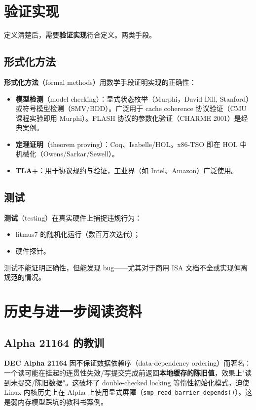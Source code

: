 \section{验证实现}

定义清楚后，需要\textbf{验证实现}符合定义。两类手段。

\subsection{形式化方法}

\textbf{形式化方法}（formal methods）用数学手段证明实现的正确性：

\begin{itemize}
\item \textbf{模型检测}（model checking）：显式状态枚举（Murphi，David Dill, Stanford）或符号模型检测（SMV/BDD）。广泛用于 cache coherence 协议验证（CMU 课程实验即用 Murphi）。FLASH 协议的参数化验证（CHARME 2001）是经典案例。
\item \textbf{定理证明}（theorem proving）：Coq、Isabelle/HOL。x86-TSO 即在 HOL 中机械化（Owens/Sarkar/Sewell）。
\item \textbf{TLA+}：用于协议规约与验证，工业界（如 Intel、Amazon）广泛使用。
\end{itemize}


\subsection{测试}

\textbf{测试}（testing）在真实硬件上捕捉违规行为：

\begin{itemize}
\item litmus7 的随机化运行（数百万次迭代）；
\item 硬件探针。
\end{itemize}


测试不能证明正确性，但能发现 bug——尤其对于商用 ISA 文档不全或实现偏离规范的情况。

\section{历史与进一步阅读资料}

\subsection{Alpha 21164 的教训}

\textbf{DEC Alpha 21164} 因不保证数据依赖序（data-dependency ordering）而著名：一个读可能在挂起的连贯性失效/写提交完成前返回\textbf{本地缓存的陈旧值}，效果上"读到未提交/陈旧数据"。这破坏了 double-checked locking 等惰性初始化模式，迫使 Linux 内核历史上在 Alpha 上使用显式屏障（\texttt{smp\_read\_barrier\_depends()}）。这是弱内存模型踩坑的教科书案例。

